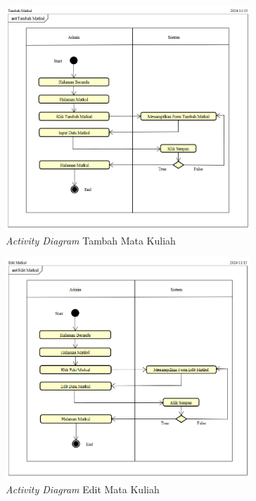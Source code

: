\begin{figure}
	\centering
	\includegraphics[width=0.82\textwidth]{konten/gambar/activity-diagram/tambah-matkul.png}
	\caption{\textit{Activity Diagram} Tambah Mata Kuliah}
	\label{activity-diagram-tambah-matkul}
\end{figure}

\begin{figure}
	\centering
	\includegraphics[width=0.82\textwidth]{konten/gambar/activity-diagram/edit-matkul.png}
	\caption{\textit{Activity Diagram} Edit Mata Kuliah}
	\label{activity-diagram-edit-matkul}
\end{figure}

